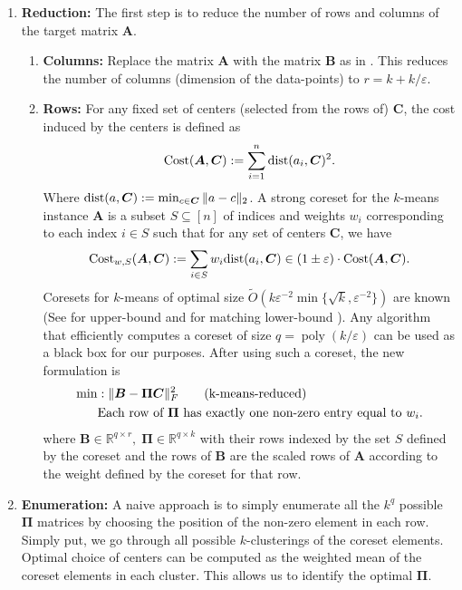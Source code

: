\documentclass[11pt]{article}
\newcommand{\sumL}{\sum\limits}
\theoremstyle{plain}
\theoremstyle{plain}
\theoremstyle{definition}
\theoremstyle{plain}
\theoremstyle{remark}
\newcommand{\RR}{\mathbb{R}}
\newcommand{\poly}{\operatorname{poly}}
\begin{document}
\begin{enumerate}
    \item \textbf{Reduction:} The first step is to reduce the number of rows and columns of the target matrix $\bm{A}$. 
    \begin{enumerate}
        \item \textbf{Columns:} Replace the matrix $\bm{A}$ with the matrix $\bm{B}$ as in . This reduces the number of columns (dimension of the data-points) to $r=k+k/\varepsilon$. 
        \item \textbf{Rows:} For any fixed set of centers (selected from the rows of) $\bm{C}$, the cost induced by the centers is defined as
\begin{align*}
  \textnormal{Cost}(\bm{A}, \bm{C}):= \sumL_{i=1}^n \textnormal{dist}(a_i,\bm{C})^2.
\end{align*}
Where $\textnormal{dist}(a,\bm{C}):= \min_{c\in \bm{C}}\|a-c\|_2$. A strong coreset for the $k$-means instance $\bm{A}$ is a subset $S\subseteq [n]$ of indices and weights $w_i$ corresponding to each index $i\in S$ such that for any set of centers $\bm{C}$, we have 
\begin{align*}
   \textnormal{Cost}_{w,S}(\bm{A}, \bm{C}):=\sumL_{i\in S}w_i \textnormal{dist}(a_i, \bm{C}) \in (1\pm \varepsilon)\cdot \textnormal{Cost}(\bm{A}, \bm{C}).
\end{align*}
Coresets for $k$-means of optimal size $\widetilde{O}(k\varepsilon^{-2}\min\{\sqrt{k}, \varepsilon^{-2}\})$ are known (See \cite{cohenkmeanscoreset2022} for upper-bound and \cite{Huang2024coresetoptimallb} for matching lower-bound ). Any algorithm that efficiently computes a coreset of size $q=\poly(k/\varepsilon)$ can be used as a black box for our purposes. After using such a coreset, the new formulation is 
    \begin{align}
\label{prog:k-means-reduced}     \min&: \|\bm{B}- \bm{\Pi}\bm{C}\|_F^2 \tag{k-means-reduced}\\
 \label{eqn:row-condition-k-means-reduced}   &\textnormal{Each row of } \bm{\Pi} \textnormal{ has exactly one non-zero entry equal to } w_i. 
\end{align}
where $\bm{B}\in \RR^{q\times r}, \; \bm{\Pi}\in \RR^{q\times k}$ with their rows indexed by the set $S$ defined by the coreset and the rows of $\bm{B}$ are the scaled rows of $\bm{A}$ according to the weight defined by the coreset for that row.  
    \end{enumerate} 

\item \textbf{Enumeration:} A naive approach is to simply enumerate all the $k^q$ possible $\bm{\Pi}$ matrices by choosing the position of the non-zero element in each row. Simply put, we go through all possible $k$-clusterings of the coreset elements. Optimal choice of centers can be computed as the weighted mean of the coreset elements in each cluster. This allows us to identify the optimal $\bm{\Pi}$. 



\end{enumerate}
\end{document}

